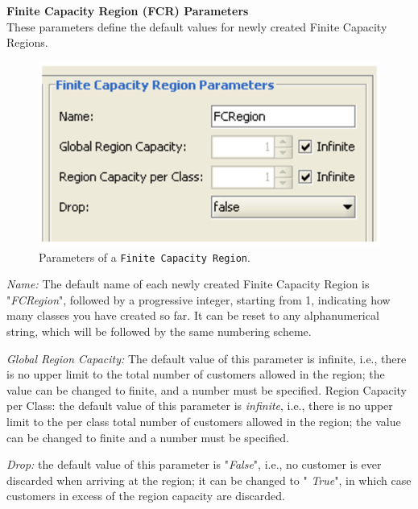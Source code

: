 \noindent \textbf{Finite Capacity Region (FCR) Parameters}\\
These parameters define the default values for newly created
Finite Capacity Regions.\\
\begin{figure}[htb]
    \begin{center}
        \includegraphics[scale=.5]{img/jsimg/9.5.eps}
    \end{center}
    \caption{Parameters of a \texttt{Finite Capacity Region}.}
    \label{fig:parfcreg}
\end{figure}
\begin{itemize*}
\item \emph{Name:} The default name of each newly created Finite
Capacity Region is "\emph{FCRegion}", followed by a progressive
integer, starting from 1, indicating how many classes you have
created so far. It can be reset to any alphanumerical string,
which will be followed by the same numbering scheme. \item
\emph{Global Region Capacity:} The default value of this parameter
is infinite, i.e., there is no upper limit to the total number of
customers allowed in the region; the value can be changed to
finite, and a number must be specified. Region Capacity per Class:
the default value of this parameter is \emph{infinite}, i.e.,
there is no upper limit to the per class total number of customers
allowed in the region; the value can be changed to finite and a
number must be specified. \item \emph{Drop:} the default value of
this parameter is "\emph{False}", i.e., no customer is ever
discarded when arriving at the region; it can be changed to "
\emph{True}", in which case customers in excess of the region
capacity are discarded.
\end{itemize*}

